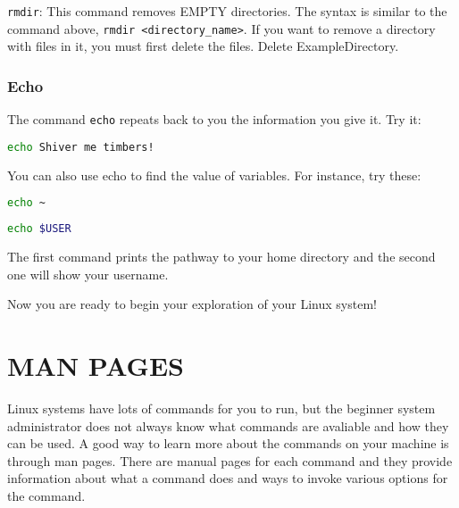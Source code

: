 \documentclass[11pt,a4paper]{article}
\begin{document}
\verb|rmdir|: This command removes EMPTY directories. The syntax is similar to the command above, \verb|rmdir <directory_name>|. If you want to remove a directory with files in it, you must first delete the files. Delete ExampleDirectory.

\subsubsection*{Echo}

\indent\indent The command \verb|echo| repeats back to you the information you give it. Try it:

\begin{lstlisting}[basicstyle=\ttfamily, backgroundcolor = \color{lightgray}, language = bash, xleftmargin = 0cm, framexleftmargin = 1em]
echo Shiver me timbers!
\end{lstlisting}

You can also use echo to find the value of variables. For instance, try these:

\begin{lstlisting}[basicstyle=\ttfamily, backgroundcolor = \color{lightgray}, language = bash, xleftmargin = 0cm, framexleftmargin = 1em]
echo ~
\end{lstlisting}

\begin{lstlisting}[basicstyle=\ttfamily, backgroundcolor = \color{lightgray}, language = bash, xleftmargin = 0cm, framexleftmargin = 1em]
echo $USER
\end{lstlisting}

The first command prints the pathway to your home directory and the second one will show your username.

Now you are ready to begin your exploration of your Linux system!



\pagebreak

\section{MAN PAGES}

Linux systems have lots of commands for you to run, but the beginner system administrator does not always know what commands are avaliable and how they can be used. A good way to learn more about the commands on your machine is through man pages. There are manual pages for each command and they provide information about what a command does and ways to invoke various options for the command. \\
\end{document}
